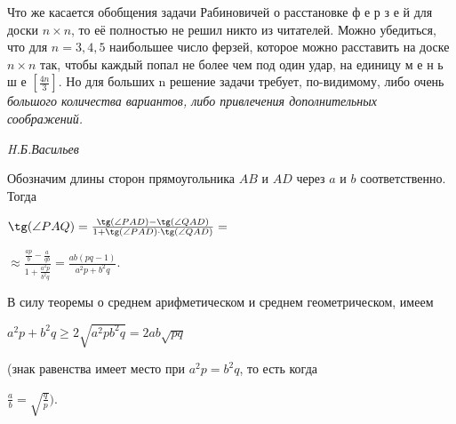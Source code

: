 \begin{minipage}{.6\textwidth}
    \hspace{0.5cm}Что же касается обобщения задачи Рабиновичей о расстановке ф е р з е й для доски $n\times n$, то её полностью не решил никто из читателей. Можно убедиться, что для $n=3,4,5$ наибольшее число ферзей, которое можно расставить на доске $n\times n$ так, чтобы каждый попал не более чем под один удар, на единицу м е н ь ш е $[\frac{4n}{3}]$. Но для больших n решение задачи требует, по-видимому, либо очень \emph{большого количества вариантов, либо привлечения дополнительных соображений.}
    \begin{flushright}
        \textsl{H.Б.Васильев}
    \end{flushright}

   \hspace{0.5cm}Обозначим длины сторон прямоугольника $AB$ и $AD$ через $a$ и $b$ соответственно. Тогда 
   
   $\tg(\angle PAQ)=\frac{\tg(\angle PAD)-\tg(\angle QAD)}{1 + \tg(\angle PAD)\cdot\tg(\angle QAD)}=$
   
   \begin{flushright}
        \Large{$\approx\frac{\frac{ap}{b}-\frac{a}{qb}}{1+\frac{a^2p}{b^2q}}=\frac{ab(pq-1)}{a^2p+b^2q}$}.
   \end{flushright}
  В силу теоремы о среднем арифметическом и среднем геометрическом, имеем

  \begin{center}
      $a^2p+b^2q\ge2\sqrt{a^2pb^2q}=2ab\sqrt{pq}$
  \end{center}
  (знак равенства имеет место при $a^2p=b^2q$, то есть когда
  \begin{center}
      \large{$\frac{a}{b}=\sqrt{\frac{q}{p}}\Big)$}.
  \end{center}
\end{minipage}